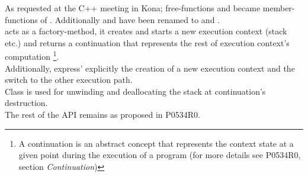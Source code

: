 
As requested at the C++ meeting in Kona; free-functions \getdata and \dataavail
became member-functions of \cont. Additionally  and
 have been renamed to \resume and
\resumewith.\\
\newline
\callcc acts as a factory-method, it creates and starts a new execution context
(stack etc.) and returns a continuation that represents the rest of execution
context's computation \footnote{A continuation is an abstract concept that
represents the context state at a given point during the execution of a program
(for more details see P0534R0, section \emph{Continuation}\cite{P0534R0})}.\\
Additionally, \callcc express' explicitly the creation of a new execution
context and the switch to the other execution path.\\
\newline
Class  is used for unwinding and deallocating the stack
at continuation's destruction.\\
\newline
The rest of the API remains as proposed in P0534R0\cite{P0534R0}.
